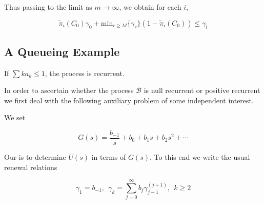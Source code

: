 \documentclass[12pt]{article}
\theoremstyle{nonumberbreak}
\begin{document}
Thus passing to the limit as $m \to \infty $, we obtain for each $i$,

$$
\tilde{\pi}_i (C_0)\gamma_0 + \mathrm{min}_{r \ge M} \{ \gamma_r \} (1 - \tilde{\pi}_i (C_0)) \le \gamma_i
$$


\subsection{A Queueing Example}


If $\sum k a_k \le 1$, the process is recurrent.

In order to ascertain whether the process $\mathcal{B}$ is null recurrent or positive recurrent we first deal with the following auxiliary problem of some independent interest.

We set 

$$
G(s) = \frac{b_{-1}}{s} + b_0 + b_1 s + b_2 s^2 + \cdots
$$


Our is to determine $U(s)$ in terms of $G(s)$. To this end we write the usual renewal relations 

$$
\gamma_1 = b_{-1}, \ \ \gamma_k = \sum_{j=0}^\infty b_j \gamma_{j-1}^{(j+1)}, \ \ k \ge 2
$$
\end{document}
